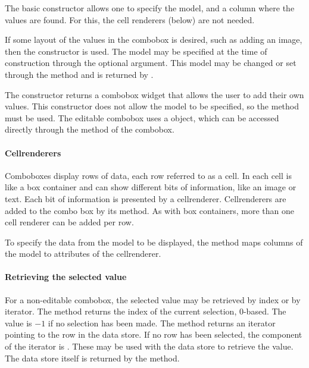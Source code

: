 The basic  constructor
allows one to specify the model, and a column where the values are
found. For this, the cell renderers (below) are not needed.

If some layout of the values in the combobox is desired, such as adding an image,
then the constructor
 is used. The model may be specified at the time of
construction through the optional 
argument.  This model may be changed or set through the
 method and is returned by
.

The constructor  returns a combobox
widget that allows the user to add their own values. This constructor
does not allow the model to be specified, so the 
method must be used. The editable combobox uses a 
object, which can be accessed directly through the
 method of the combobox.

\paragraph{Cellrenderers}
Comboboxes display rows of data, each row referred to as a cell. In \GTK\/ each cell is like a box
container and can show different bits of information, like an image or
text. Each bit of information is presented by a cellrenderer.
Cellrenderers are added to the combo box by its
 method. As with box containers, more
than one cell renderer can be added per row.

To specify the data from the model to be
displayed, the  method maps
columns of the model to attributes of the cellrenderer. 



\paragraph{Retrieving the selected value}
For a non-editable combobox, the selected value may be retrieved by
index or by iterator. The  method
returns the index of the current selection, $0$-based. The value is $-1$
if no selection has been made. The
 method returns an iterator
pointing to the row in the data store. If no row has been selected,
the  component of the iterator is . These may
be used with the data store to retrieve the value. The data store
itself is returned by the  method.


